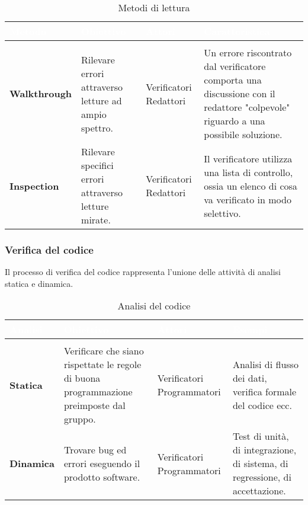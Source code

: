 \renewcommand{\arraystretch}{1.5}
\renewcommand\extrarowheight{1.5pt}
\begin{longtable}{C{3cm} | C{4cm} C{3cm} C{5cm}}
		\textcolor{white}{\textbf{Metodo}} & 
		\textcolor{white}{\textbf{Obiettivo}} & 
		\textcolor{white}{\textbf{Attori}} & 
		\textcolor{white}{\textbf{Caratteristica}} \\
		\endfirsthead
		\\
	    \endfoot
	    \caption{Metodi di lettura}
	    \endlastfoot
		\hline
		\textbf{Walkthrough} & 
		Rilevare errori attraverso letture ad ampio spettro. & 
		Verificatori \newline Redattori & 
		Un errore riscontrato dal verificatore comporta una discussione con il redattore "colpevole" riguardo a una possibile soluzione. \\
		\textbf{Inspection} & 
		Rilevare specifici errori attraverso letture mirate. & 
		Verificatori \newline Redattori & 
		Il verificatore utilizza una lista di controllo, ossia un elenco di cosa va verificato in modo selettivo. \\
\end{longtable}

\subsubsection{Verifica del codice}
Il processo di verifica del codice rappresenta l'unione delle attività di analisi statica e dinamica. 

\renewcommand{\arraystretch}{1.5}
\renewcommand\extrarowheight{1.5pt}
\begin{longtable}{C{3cm} | C{4cm} C{3cm} C{5cm}}
		\textcolor{white}{\textbf{Analisi}} & 
		\textcolor{white}{\textbf{Obiettivo}} & 
		\textcolor{white}{\textbf{Attori}} & 
		\textcolor{white}{\textbf{Esempi}} \\
		\endfirsthead
		\\
	    \endfoot
	    \caption{Analisi del codice}
	    \endlastfoot
		\hline
		\textbf{Statica} & 
		Verificare che siano rispettate le regole di buona programmazione preimposte dal gruppo. & 
		Verificatori \newline Programmatori & 
		Analisi di flusso dei dati, verifica formale del codice ecc. \\
		\textbf{Dinamica} & 
		Trovare bug ed errori eseguendo il prodotto software.  & 
		Verificatori \newline Programmatori & 
		Test di unità, di integrazione, di sistema, di regressione, di accettazione. \\
\end{longtable}


